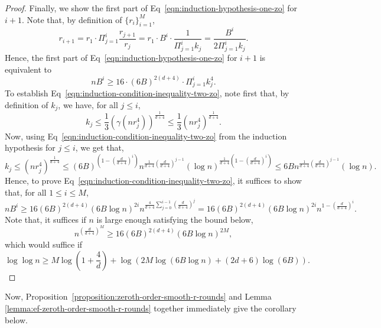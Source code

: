 \begin{proof}
Finally, we show the first part of Eq~\eqref{eqn:induction-hypothesis-one-zo} 
for $i+1$. Note that, by definition of $\{r_i\}_{i=1}^M$, 
\begin{equation*}
r_{i+1} = r_1 \cdot \Pi_{j=1}^{i} \frac{r_{j+1}}{r_{j}} = r_1 \cdot 
	B^i \cdot 
	\frac{1 }{\Pi_{j=1}^{i} k_j} = \frac{B^i}{2\Pi_{j=1}^{i} k_j}. 
\end{equation*}
Hence, the first part of Eq~\eqref{eqn:induction-hypothesis-one-zo} 
for $i+1$ is equivalent to
\begin{equation}
\label{eqn:induction-condition-inequality-two-zo}
nB^{i} \geq  16 \cdot (6B)^{2(d+4)} \cdot \Pi_{j=1}^{i} k_j^4. 
\end{equation}
To establish Eq~\eqref{eqn:induction-condition-inequality-two-zo}, note 
first that, by definition of $k_j$, we have, for all $j \leq i$, 
\begin{equation*}
k_j \leq \frac{1}{3} (\gamma(n r_j^4))^\frac{1}{d+4} \leq 
	 \frac{1}{3} (nr_j^4)^{\frac{1}{d+4}}. 
\end{equation*}
Now, using Eq~\eqref{eqn:induction-condition-inequality-two-zo} 
from the induction hypothesis for $j \leq i$, we get that, 
\begin{equation*}
k_j \leq (n r_j^4)^\frac{1}{d+4}  \leq 
	(6B)^{\left(1-\left(\frac{d}{d+4}\right)^i\right)}
	n^{\frac{1}{d+4}(\frac{d}{d+4})^{j-1}} (\log n)^{\frac{1}{d+4}\left(1-\left(\frac{d}{d+4}\right)^i\right)}
	\leq 6 B n^{\frac{1}{d+4}(\frac{d}{d+4})^{j-1}} (\log n).
\end{equation*}
Hence, to prove Eq~\eqref{eqn:induction-condition-inequality-two-zo}, it 
suffices to show that, for all $1\leq i\leq M$, 
\begin{equation*}
nB^i \geq 16  (6B)^{2(d+4)} (6B \log n)^{2i}
	n^{\frac{4}{d+4}\sum_{j=0}^{i-1} \left(\frac{d}{d+4}\right)^j}
	= 16 (6B)^{2(d+4)} (6B \log n)^{2i} n^{1- \left(\frac{d}{d+4}\right)^i}.
\end{equation*}
Note that, it suffices if $n$ is large enough satisfying the bound below, 
\begin{equation*}
n^{\left(\frac{d}{d+4}\right)^M} \geq 16 (6B)^{2(d+4)} (6B\log n)^{2M},
\end{equation*}
which would suffice if
\begin{equation*}
\log \log n \geq M \log \left(1+ \frac{4}{d}\right)
	+ \log \left(2M \log(6B \log n) + (2d+6)\log (6B)\right).
\end{equation*}
\end{proof}
Now, Proposition~\ref{proposition:zeroth-order-smooth-r-rounds} and Lemma 
\ref{lemma:ef-zeroth-order-smooth-r-rounds} together immediately give the 
corollary below. 

